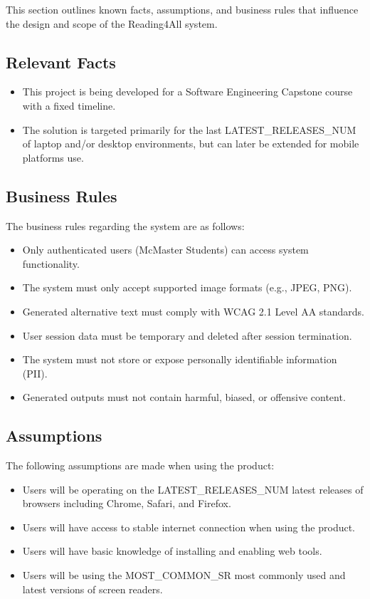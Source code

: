 \documentclass[12pt]{article}
\begin{document}
This section outlines known facts, assumptions, and business rules that influence the design and scope of the Reading4All system.

\subsection{Relevant Facts}
\begin{itemize}
  \item This project is being developed for a Software Engineering
    Capstone course with a fixed timeline.
  \item The solution is targeted primarily for the last LATEST\_RELEASES\_NUM of laptop and/or desktop
    environments, but can later be extended for mobile platforms use.
\end{itemize}
\subsection{Business Rules}
The business rules regarding the system are as follows:
\begin{itemize}
  \item Only authenticated users (McMaster Students) can access system functionality.
  \item The system must only accept supported image formats (e.g., JPEG, PNG).
  \item Generated alternative text must comply with WCAG 2.1 Level AA standards.
  \item User session data must be temporary and deleted after session termination.
  \item The system must not store or expose personally identifiable information (PII).
  \item Generated outputs must not contain harmful, biased, or offensive content.
\end{itemize}

\subsection{Assumptions}
The following assumptions are made when using the product:
\begin{itemize}
  \item Users will be operating on the LATEST\_RELEASES\_NUM latest releases of
    browsers including Chrome, Safari, and Firefox.
  \item Users will have access to stable internet connection when
    using the product.
  \item Users will have basic knowledge of installing and enabling web tools.
  \item Users will be using the MOST\_COMMON\_SR most commonly used and latest
    versions of screen readers.
\end{itemize}
\end{document}
